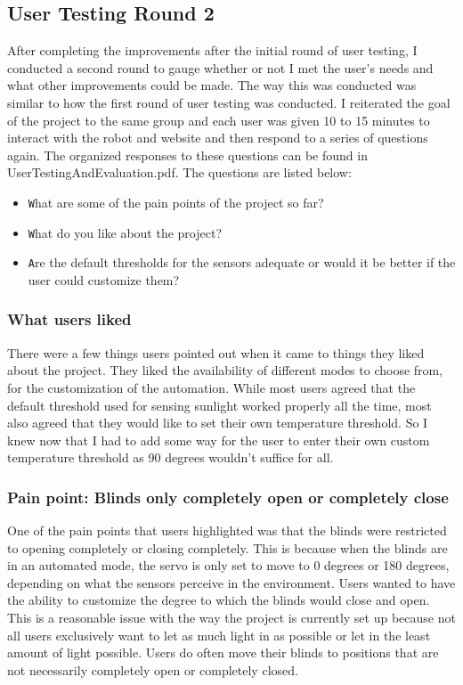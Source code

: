 \documentclass[10pt,twocolumn]{article}
\begin{document}
\subsection{User Testing Round 2}
After completing the improvements after the initial round of user testing, I conducted a second round to gauge whether or not I met the user’s needs and what other improvements could be made. The way this was conducted was similar to how the first round of user testing was conducted. I reiterated the goal of the project to the same group and each user was given 10 to 15 minutes to interact with the robot and website and then respond to a series of questions again. The organized responses to these questions can be found in UserTestingAndEvaluation.pdf. The questions are listed below:

\begin{itemize}
    \item \texttt What are some of the pain points of the project so far?
    \item \texttt What do you like about the project?
    \item \texttt Are the default thresholds for the sensors adequate or would it be better if the user could customize them?
\end{itemize}

\subsubsection{What users liked}
There were a few things users pointed out when it came to things they liked about the project. They liked the availability of different modes to choose from, for the customization of the automation. While most users agreed that the default threshold used for sensing sunlight worked properly all the time, most also agreed that they would like to set their own temperature threshold. So I knew now that I had to add some way for the user to enter their own custom temperature threshold as 90 degrees wouldn't suffice for all.

\subsubsection{Pain point: Blinds only completely open or completely close}
One of the pain points that users highlighted was that the blinds were restricted to opening completely or closing completely. This is because when the blinds are in an automated mode, the servo is only set to move to 0 degrees or 180 degrees, depending on what the sensors perceive in the environment. Users wanted to have the ability to customize the degree to which the blinds would close and open. This is a reasonable issue with the way the project is currently set up because not all users exclusively want to let as much light in as possible or let in the least amount of light possible. Users do often move their blinds to positions that are not necessarily completely open or completely closed.
\end{document}
